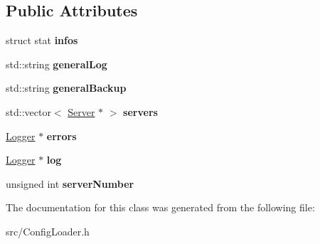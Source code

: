 \subsection*{Public Attributes}
\begin{DoxyCompactItemize}
\item 
\hypertarget{class_config_loader_1_1_options_a6c97d418ac9b70f39d765d2a327ece1a}{
struct stat {\bfseries infos}}
\label{class_config_loader_1_1_options_a6c97d418ac9b70f39d765d2a327ece1a}

\item 
\hypertarget{class_config_loader_1_1_options_a7e17de2b78389dbc12d36250fa0acd1b}{
std::string {\bfseries generalLog}}
\label{class_config_loader_1_1_options_a7e17de2b78389dbc12d36250fa0acd1b}

\item 
\hypertarget{class_config_loader_1_1_options_a08177122ab1fc04523e09d61935e34a8}{
std::string {\bfseries generalBackup}}
\label{class_config_loader_1_1_options_a08177122ab1fc04523e09d61935e34a8}

\item 
\hypertarget{class_config_loader_1_1_options_a6d1ece734801582d3f2b795677df5fb0}{
std::vector$<$ \hyperlink{class_server}{Server} $\ast$ $>$ {\bfseries servers}}
\label{class_config_loader_1_1_options_a6d1ece734801582d3f2b795677df5fb0}

\item 
\hypertarget{class_config_loader_1_1_options_a93140f4df11aa64661dc43c4b6f3ff8f}{
\hyperlink{class_logger}{Logger} $\ast$ {\bfseries errors}}
\label{class_config_loader_1_1_options_a93140f4df11aa64661dc43c4b6f3ff8f}

\item 
\hypertarget{class_config_loader_1_1_options_a31b29b261396b492fb2a6de11f656f33}{
\hyperlink{class_logger}{Logger} $\ast$ {\bfseries log}}
\label{class_config_loader_1_1_options_a31b29b261396b492fb2a6de11f656f33}

\item 
\hypertarget{class_config_loader_1_1_options_ab09ed7a0ddc1d9fd18486e70fc5aaa6c}{
unsigned int {\bfseries serverNumber}}
\label{class_config_loader_1_1_options_ab09ed7a0ddc1d9fd18486e70fc5aaa6c}

\end{DoxyCompactItemize}


The documentation for this class was generated from the following file:\begin{DoxyCompactItemize}
\item 
src/ConfigLoader.h\end{DoxyCompactItemize}
